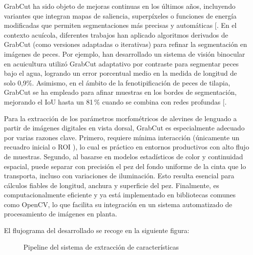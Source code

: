 \documentclass[a4paper,10pt,spanish]{jupyterBook}
\begin{document}
\sphinxAtStartPar
GrabCut ha sido objeto de mejoras continuas en los últimos años, incluyendo variantes que integran mapas de saliencia, superpíxeles o funciones de energía modificadas que permiten segmentaciones más precisas y automáticas {[}\sphinxhref{https://doi.org/10.3390/math11081965}{Wang et al., 2023}{]}. En el contexto acuícola, diferentes trabajos han aplicado algoritmos derivados de GrabCut (como versiones adaptadas o iterativas) para refinar la segmentación en imágenes de peces. Por ejemplo,  han desarrollado un sistema de visión binocular en acuicultura utilizó GrabCut adaptativo por contraste para segmentar peces bajo el agua, logrando un error porcentual medio en la medida de longitud de solo 0,9\%. Asimismo, en el ámbito de la fenotipificación de peces de tilapia, GrabCut se ha empleado para afinar muestras en los bordes de segmentación, mejorando el IoU hasta un 81 \% cuando se combina con redes profundas {[}\sphinxhref{https://doi.org/10.3390/app13179635}{Feng et al., 2023}{]}.

\sphinxAtStartPar
Para la extracción de los parámetros morfométricos de alevines de lenguado a partir de imágenes digitales en vista dorsal, GrabCut es especialmente adecuado por varias razones clave. Primero, requiere mínima interacción (únicamente un recuadro inicial o ROI \sphinxhyphen{} ), lo cual es práctico en entornos productivos con alto flujo de muestras. Segundo, al basarse en modelos estadísticos de color y continuidad espacial, puede separar con precisión el pez del fondo uniforme de la cinta que lo transporta, incluso con variaciones de iluminación. Esto resulta esencial para cálculos fiables de longitud, anchura y superficie del pez. Finalmente, es computacionalmente eficiente y ya está implementado en bibliotecas comunes como OpenCV, lo que facilita su integración en un sistema automatizado de procesamiento de imágenes en planta.

\sphinxAtStartPar
El flujograma del  desarrollado se recoge en la siguiente figura:

\begin{figure}[htbp]
\centering
\capstart

\noindent{}
\caption{Pipeline del sistema de extracción de características}\label{\detokenize{content/01/Imagen:figura-wp1-imagen-1}}\end{figure}
\end{document}
